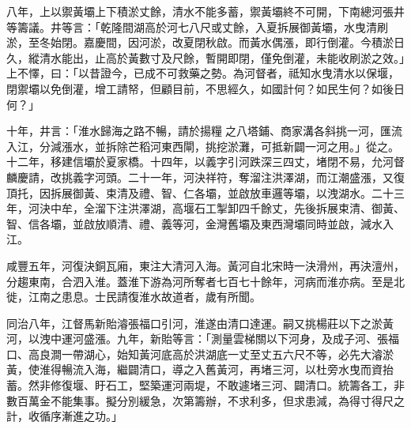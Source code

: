 \begin{pinyinscope}
八年，上以禦黃壩上下積淤丈餘，清水不能多蓄，禦黃壩終不可開，下南總河張井等籌議。井等言：「乾隆間湖高於河七八尺或丈餘，入夏拆展御黃壩，水曳清刷淤，至冬始閉。嘉慶間，因河淤，改夏閉秋啟。而黃水偶漲，即行倒灌。今積淤日久，縱清水能出，止高於黃數寸及尺餘，暫開即閉，僅免倒灌，未能收刷淤之效。」上不懌，曰：「以昔證今，已成不可救藥之勢。為河督者，祗知水曳清水以保堰，閉禦壩以免倒灌，增工請帑，但顧目前，不思經久，如國計何？如民生何？如後日何？」

十年，井言：「淮水歸海之路不暢，請於揚糧之八塔鋪、商家溝各斜挑一河，匯流入江，分減漲水，並拆除芒稻河東西閘，挑挖淤灘，可抵新闢一河之用。」從之。十二年，移建信壩於夏家橋。十四年，以義字引河跌深三四丈，堵閉不易，允河督麟慶請，改挑義字河頭。二十一年，河決祥符，奪溜注洪澤湖，而江潮盛漲，又復頂托，因拆展御黃、束清及禮、智、仁各壩，並啟放車邏等壩，以洩湖水。二十三年，河決中牟，全溜下注洪澤湖，高堰石工掣卸四千餘丈，先後拆展束清、御黃、智、信各壩，並啟放順清、禮、義等河，金灣舊壩及東西灣壩同時並啟，減水入江。

咸豐五年，河復決銅瓦廂，東注大清河入海。黃河自北宋時一決滑州，再決澶州，分趨東南，合泗入淮。蓋淮下游為河所奪者七百七十餘年，河病而淮亦病。至是北徙，江南之患息。士民請復淮水故道者，歲有所聞。

同治八年，江督馬新貽濬張福口引河，淮遂由清口達運。嗣又挑楊莊以下之淤黃河，以洩中運河盛漲。九年，新貽等言：「測量雲梯關以下河身，及成子河、張福口、高良澗一帶湖心，始知黃河底高於洪湖底一丈至丈五六尺不等，必先大濬淤黃，使淮得暢流入海，繼闢清口，導之入舊黃河，再堵三河，以杜旁水曳而資抬蓄。然非修復堰、盱石工，堅築運河兩堤，不敢遽堵三河、闢清口。統籌各工，非數百萬金不能集事。擬分別緩急，次第籌辦，不求利多，但求患減，為得寸得尺之計，收循序漸進之功。」


\end{pinyinscope}
